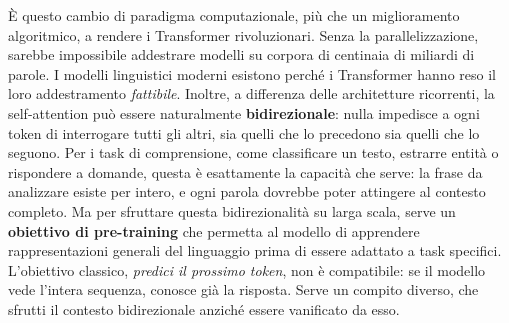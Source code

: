 È questo cambio di paradigma computazionale, più che un miglioramento algoritmico, a rendere i Transformer rivoluzionari. Senza la parallelizzazione, sarebbe impossibile addestrare modelli su corpora di centinaia di miliardi di parole. I modelli linguistici moderni esistono perché i Transformer hanno reso il loro addestramento \textit{fattibile}.
Inoltre, a differenza delle architetture ricorrenti, la self-attention può essere naturalmente \textbf{bidirezionale}: nulla impedisce a ogni token di interrogare tutti gli altri, sia quelli che lo precedono sia quelli che lo seguono. Per i task di comprensione, come classificare un testo, estrarre entità o rispondere a domande, questa è esattamente la capacità che serve: la frase da analizzare esiste per intero, e ogni parola dovrebbe poter attingere al contesto completo.
Ma per sfruttare questa bidirezionalità su larga scala, serve un \textbf{obiettivo di pre-training} che permetta al modello di apprendere rappresentazioni generali del linguaggio prima di essere adattato a task specifici. L'obiettivo classico, \textit{predici il prossimo token}, non è compatibile: se il modello vede l'intera sequenza, conosce già la risposta. Serve un compito diverso, che sfrutti il contesto bidirezionale anziché essere vanificato da esso.










